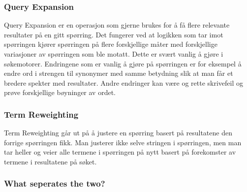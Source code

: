 \documentclass[]{article}
\begin{document}
\subsubsection*{Query Expansion}
Query Expansion er en operasjon som gjerne brukes for å få flere relevante resultater på en gitt spørring. Det fungerer ved at logikken som tar imot spørringen kjører spørringen på flere forskjellige måter med forskjellige variasjoner av spørringen som ble motatt. Dette er svært vanlig å gjøre i søkemotorer. Endringene som er vanlig å gjøre på spørringen er for eksempel å endre ord i strengen til synonymer med samme betydning slik at man får et bredere spekter med resultater. Andre endringer kan være og rette skrivefeil og prøve forskjellige bøyninger av ordet.
\subsubsection*{Term Reweighting}
Term Reweighting går ut på å justere en spørring basert på resultatene den forrige spørringen fikk. Man justerer ikke selve stringen i spørringen, men man tar heller og veier alle termene i spørringen på nytt basert på forekomster av termene i resultatene på søket.
\subsubsection*{What seperates the two?}



\pagebreak
\end{document}
